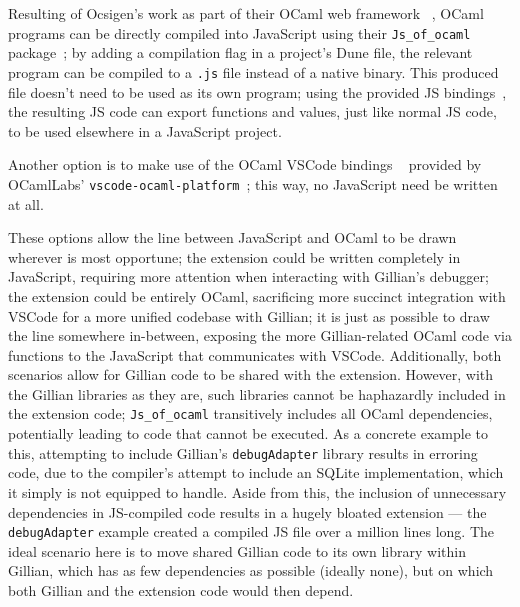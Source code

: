 Resulting of Ocsigen's work as part of their OCaml web framework
~\cite{ocsigen-framework}, OCaml programs can be directly compiled into
JavaScript using their \texttt{Js\_of\_ocaml} package~\cite{js-of-ocaml}; by
adding a compilation flag in a project's Dune file, the relevant program can be
compiled to a \texttt{.js} file instead of a native binary. This produced file
doesn't need to be used as its own program; using the provided JS
bindings~\cite{js-of-ocaml-bindings}, the resulting JS code can export
functions and values, just like normal JS code, to be used elsewhere in a
JavaScript project.

Another option is to make use of the OCaml VSCode bindings
~\cite{vscode-ocaml-bindings} provided by OCamlLabs'
\texttt{vscode-ocaml-platform}~\cite{vscode-ocaml-platform, ocamllabs}; this
way, no JavaScript need be written at all.

These options allow the line between JavaScript and OCaml to be drawn wherever
is most opportune; the extension could be written completely in JavaScript,
requiring more attention when interacting with Gillian's debugger; the
extension could be entirely OCaml, sacrificing more succinct integration with
VSCode for a more unified codebase with Gillian; it is just as possible to draw
the line somewhere in-between, exposing the more Gillian-related OCaml code via
functions to the JavaScript that communicates with VSCode. Additionally, both
scenarios allow for Gillian code to be shared with the extension. However,
with the Gillian libraries as they are, such libraries cannot be haphazardly
included in the extension code; \texttt{Js\_of\_ocaml} transitively includes all
OCaml dependencies, potentially leading to code that cannot be executed. As a
concrete example to this, attempting to include Gillian's \texttt{debugAdapter}
library results in erroring code, due to the compiler's attempt to include an
SQLite implementation, which it simply is not equipped to handle. Aside from
this, the inclusion of unnecessary dependencies in JS-compiled code results in
a hugely bloated extension --- the \texttt{debugAdapter} example created a
compiled JS file over a million lines long. The ideal scenario here is to move
shared Gillian code to its own library within Gillian, which has as few
dependencies as possible (ideally none), but on which both Gillian and the
extension code would then depend.

